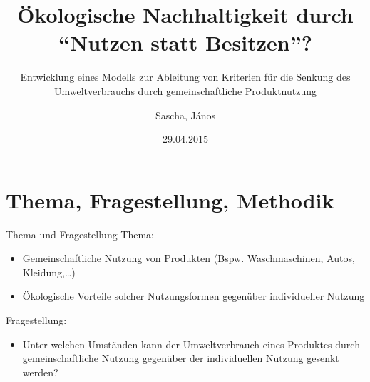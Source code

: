 \documentclass[beamer, xcolor=table]{beamer}
\title{Ökologische Nachhaltigkeit durch \\ \enquote{Nutzen statt Besitzen}?}
\subtitle{{\small Entwicklung eines Modells zur Ableitung von Kriterien für die Senkung des Umweltverbrauchs durch gemeinschaftliche Produktnutzung}}
\author{Sascha, János}
\date{29.04.2015}
\begin{document}
\frame{\titlepage}


\section{Thema, Fragestellung, Methodik}

	\begin{frame}{Thema und Fragestellung}
        Thema: 
        \begin{itemize}
            \item Gemeinschaftliche Nutzung von Produkten (Bspw. Waschmaschinen,
                Autos, Kleidung,\dots)
            \item Ökologische Vorteile solcher Nutzungsformen gegenüber
                individueller Nutzung
        \end{itemize}

        \begin{block}{Fragestellung:}
            \begin{itemize}
                \item Unter welchen Umständen kann der Umweltverbrauch eines Produktes durch gemeinschaftliche Nutzung gegenüber der individuellen Nutzung gesenkt werden?
            \end{itemize}
        \end{block}
	\end{frame}
	
\end{document}
